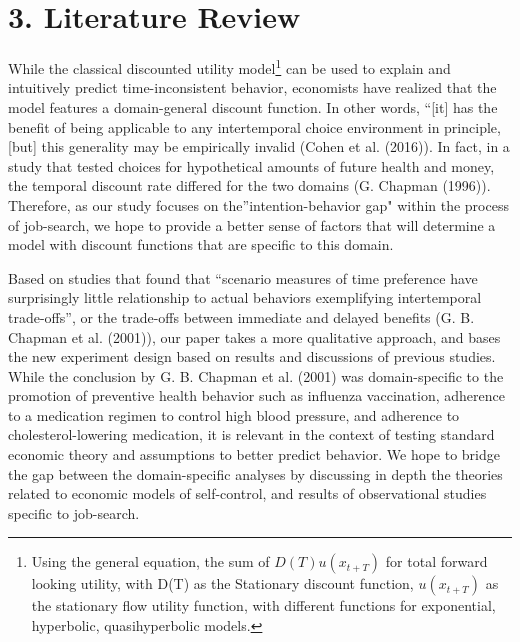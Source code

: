 \documentclass[]{elsarticle} %
\begin{document}
\section{3. Literature Review}\label{literature-review}

While the classical discounted utility model\footnote{Using the general
  equation, the sum of \(D(T)u(x_{t+T})\) for total forward looking
  utility, with D(T) as the Stationary discount function, \(u(x_{t+T})\)
  as the stationary flow utility function, with different functions for
  exponential, hyperbolic, quasihyperbolic models.} can be used to
explain and intuitively predict time-inconsistent behavior, economists
have realized that the model features a domain-general discount
function. In other words, ``{[}it{]} has the benefit of being applicable
to any intertemporal choice environment in principle, {[}but{]} this
generality may be empirically invalid (Cohen et al. (2016)). In fact, in
a study that tested choices for hypothetical amounts of future health
and money, the temporal discount rate differed for the two domains (G.
Chapman (1996)). Therefore, as our study focuses on
the''intention-behavior gap" within the process of job-search, we hope
to provide a better sense of factors that will determine a model with
discount functions that are specific to this domain.

Based on studies that found that ``scenario measures of time preference
have surprisingly little relationship to actual behaviors exemplifying
intertemporal trade-offs'', or the trade-offs between immediate and
delayed benefits (G. B. Chapman et al. (2001)), our paper takes a more
qualitative approach, and bases the new experiment design based on
results and discussions of previous studies. While the conclusion by G.
B. Chapman et al. (2001) was domain-specific to the promotion of
preventive health behavior such as influenza vaccination, adherence to a
medication regimen to control high blood pressure, and adherence to
cholesterol-lowering medication, it is relevant in the context of
testing standard economic theory and assumptions to better predict
behavior. We hope to bridge the gap between the domain-specific analyses
by discussing in depth the theories related to economic models of
self-control, and results of observational studies specific to
job-search.
\end{document}
